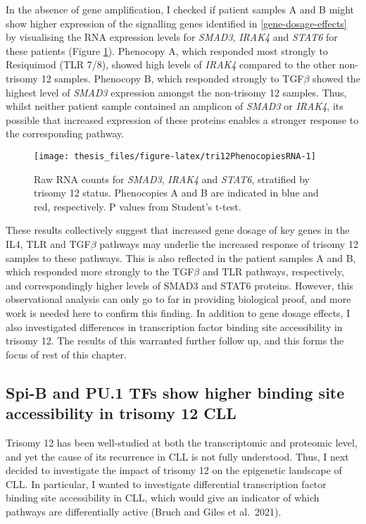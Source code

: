 \documentclass[11pt, a4paper, twosided]{book}
\begin{document}
In the absence of gene amplification, I checked if patient samples A and B might show higher expression of the signalling genes identified in \ref{gene-dosage-effects} by visualising the RNA expression levels for \emph{SMAD3}, \emph{IRAK4} and \emph{STAT6} for these patients (Figure \ref{fig:tri12PhenocopiesRNA}). Phenocopy A, which responded most strongly to Resiquimod (TLR 7/8), showed high levels of \emph{IRAK4} compared to the other non-trisomy 12 samples. Phenocopy B, which responded strongly to TGF\(\beta\) showed the highest level of \emph{SMAD3} expression amongst the non-trisomy 12 samples. Thus, whilst neither patient sample contained an amplicon of \emph{SMAD3} or \emph{IRAK4}, its possible that increased expression of these proteins enables a stronger response to the corresponding pathway.


\begin{figure}

{\centering \texttt{[image: thesis\_files/figure-latex/tri12PhenocopiesRNA-1]} 

}

\caption{Raw RNA counts for \emph{SMAD3}, \emph{IRAK4} and \emph{STAT6}, stratified by trisomy 12 status. Phenocopies A and B are indicated in blue and red, respectively. P values from Student's t-test.}\label{fig:tri12PhenocopiesRNA}
\end{figure}
These results collectively suggest that increased gene dosage of key genes in the IL4, TLR and TGF\(\beta\) pathways may underlie the increased response of trisomy 12 samples to these pathways. This is also reflected in the patient samples A and B, which responded more strongly to the TGF\(\beta\) and TLR pathways, respectively, and correspondingly higher levels of SMAD3 and STAT6 proteins. However, this observational analysis can only go to far in providing biological proof, and more work is needed here to confirm this finding. In addition to gene dosage effects, I also investigated differences in transcription factor binding site accessibility in trisomy 12. The results of this warranted further follow up, and this forms the focus of rest of this chapter.

\hypertarget{trisomy12-ATACseq}{%
\subsection{Spi-B and PU.1 TFs show higher binding site accessibility in trisomy 12 CLL}\label{trisomy12-ATACseq}}

Trisomy 12 has been well-studied at both the transcriptomic and proteomic level, and yet the cause of its recurrence in CLL is not fully understood. Thus, I next decided to investigate the impact of trisomy 12 on the epigenetic landscape of CLL. In particular, I wanted to investigate differential transcription factor binding site accessibility in CLL, which would give an indicator of which pathways are differentially active (Bruch and Giles et al.~2021).
\end{document}
